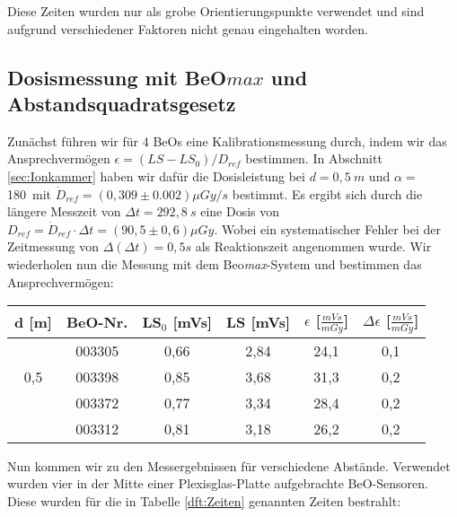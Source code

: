 Diese Zeiten wurden nur als grobe Orientierungspunkte verwendet und sind aufgrund verschiedener Faktoren nicht genau eingehalten worden.

\subsection{Dosismessung mit BeO$max$ und Abstandsquadratsgesetz}
Zunächst führen wir für 4 BeOs eine Kalibrationsmessung durch, indem wir das Ansprechvermögen $\epsilon = (LS - LS_0)/D_{ref}$ bestimmen. In Abschnitt \ref{sec:Ionkammer} haben wir dafür die Dosisleistung bei $d=0,5\ m$ und $\alpha =$ 180\textdegree \ mit $\dot{D}_{ref} = (0,309 \pm 0.002)\mu Gy /s$ bestimmt. Es ergibt sich durch die längere Messzeit von $\Delta t = 292,8\ s$ eine Dosis von $D_{ref} = \dot{D}_{ref} \cdot \Delta t = (90,5 \pm 0,6)\mu Gy$. Wobei ein systematischer Fehler bei der Zeitmessung von $\Delta(\Delta t) = 0,5s$ als Reaktionszeit angenommen wurde. Wir wiederholen nun die Messung mit dem Beo\textit{max}-System und bestimmen das Ansprechvermögen:\\

\minipanf
	\begin{center}	
		\begin{tabular}{c|c|c|c|c|c}
					\textbf{d} [m] & BeO-Nr. & \textbf{LS$_0$} [mVs] & \textbf{LS} [mVs] & \textbf{$\epsilon$} [$\frac{mVs}{mGy}$] & $\Delta \epsilon$ [$\frac{mVs}{mGy}$]  \\
			\hline  
								& 003305 & 0,66 & 2,84 & 24,1 & 0,1\\
						0,5		& 003398 & 0,85 & 3,68 & 31,3 & 0,2\\
								& 003372 & 0,77 & 3,34 & 28,4 & 0,2\\
								& 003312 & 0,81 & 3,18 & 26,2 & 0,2\\								
		\end{tabular}
	\end{center}
\minipend
\vspace{3mm}

Nun kommen wir zu den Messergebnissen für verschiedene Abstände. Verwendet wurden vier in der Mitte einer Plexisglas-Platte aufgebrachte BeO-Sensoren. Diese wurden für die in Tabelle \ref{dft:Zeiten} genannten Zeiten bestrahlt: 

